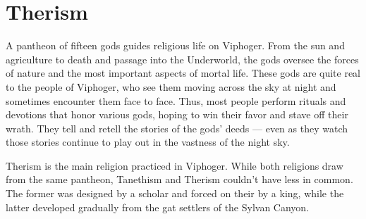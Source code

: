 
\vspace{14.0cm}

\section{Therism} \label{ssec::therism}

A pantheon of fifteen gods guides religious life on Viphoger.
From the sun and agriculture to death and passage into the Underworld, the gods oversee the forces of nature and the most important aspects of mortal life.
These gods are quite real to the people of Viphoger, who see them moving across the sky at night and sometimes encounter them face to face.
Thus, most people perform rituals and devotions that honor various gods, hoping to win their favor and stave off their wrath.
They tell and retell the stories of the gods' deeds --- even as they watch those stories continue to play out in the vastness of the night sky.

Therism is the main religion practiced in Viphoger.
While both religions draw from the same pantheon, Tanethism and Therism couldn't have less in common.
The former was designed by a scholar and forced on their by a king, while the latter developed gradually from the gat settlers of the Sylvan Canyon.

